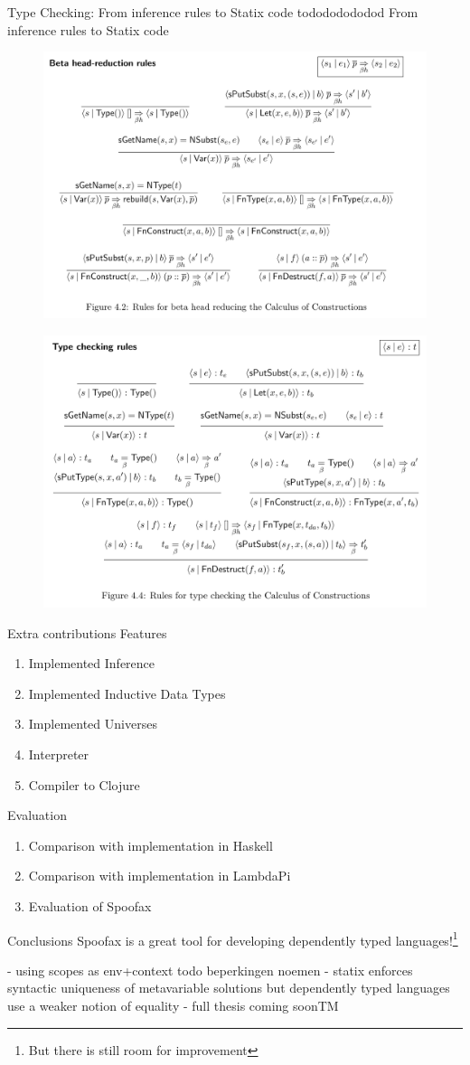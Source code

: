 \documentclass[aspectratio=43]{beamer}
\begin{document}
\begin{frame}[fragile]{Type Checking: From inference rules to Statix code}
	todododododod From inference rules to Statix code
	
	\begin{figure}
		\centering
		\includegraphics[width=0.5\linewidth]{img/screenshot001}
		\label{fig:screenshot001}
	\end{figure}
	\begin{figure}
		\centering
		\includegraphics[width=0.5\linewidth]{img/screenshot002}
		\label{fig:screenshot002}
	\end{figure}
	
\end{frame}

\begin{frame}[fragile]{Extra contributions}
Features
\begin{enumerate}
	\item Implemented Inference
	\item Implemented Inductive Data Types
	\item Implemented Universes
	\item Interpreter
	\item Compiler to Clojure
\end{enumerate}
Evaluation
\begin{enumerate}
	\item Comparison with implementation in Haskell
	\item Comparison with implementation in LambdaPi
	\item Evaluation of Spoofax
\end{enumerate}
\end{frame}

\begin{frame}[fragile]{Conclusions}
	Spoofax is a great tool for developing dependently typed languages!\footnote{But there is still room for improvement}
	
	- using scopes as env+context 
	todo beperkingen noemen 
	- statix enforces syntactic uniqueness of metavariable solutions but dependently typed languages use a weaker notion of equality 
	- full thesis coming soonTM
\end{frame}

\end{document}
